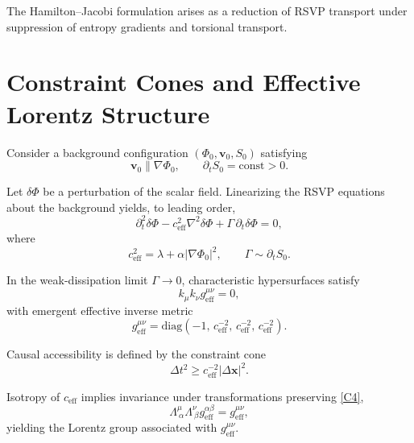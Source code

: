 \documentclass[11pt]{article}
\begin{document}
The Hamilton--Jacobi formulation arises as a reduction of RSVP transport under suppression of entropy gradients and torsional transport.

\section{Constraint Cones and Effective Lorentz Structure}

Consider a background configuration $(\Phi_0,\mathbf{v}_0,S_0)$ satisfying
\begin{equation}
\mathbf{v}_0 \parallel \nabla\Phi_0,
\qquad
\partial_t S_0 = \mathrm{const} > 0.
\label{C1}
\end{equation}

Let $\delta\Phi$ be a perturbation of the scalar field. Linearizing the RSVP equations about the background yields, to leading order,
\begin{equation}
\partial_t^2 \delta\Phi
-
c_{\mathrm{eff}}^2 \nabla^2 \delta\Phi
+
\Gamma\,\partial_t \delta\Phi
=0,
\label{C2}
\end{equation}
where
\begin{equation}
c_{\mathrm{eff}}^2 = \lambda + \alpha |\nabla\Phi_0|^2,
\qquad
\Gamma \sim \partial_t S_0.
\label{C3}
\end{equation}

In the weak-dissipation limit $\Gamma \to 0$, characteristic hypersurfaces satisfy
\begin{equation}
k_\mu k_\nu g_{\mathrm{eff}}^{\mu\nu} = 0,
\label{C4}
\end{equation}
with emergent effective inverse metric
\begin{equation}
g_{\mathrm{eff}}^{\mu\nu}
=
\mathrm{diag}
\left(
-1,\,
c_{\mathrm{eff}}^{-2},\,
c_{\mathrm{eff}}^{-2},\,
c_{\mathrm{eff}}^{-2}
\right).
\label{C5}
\end{equation}

Causal accessibility is defined by the constraint cone
\begin{equation}
\Delta t^2 \ge c_{\mathrm{eff}}^{-2} |\Delta \mathbf{x}|^2.
\label{C6}
\end{equation}

Isotropy of $c_{\mathrm{eff}}$ implies invariance under transformations preserving \eqref{C4},
\begin{equation}
\Lambda^\mu_{\ \alpha}\Lambda^\nu_{\ \beta} g_{\mathrm{eff}}^{\alpha\beta}
=
g_{\mathrm{eff}}^{\mu\nu},
\label{C7}
\end{equation}
yielding the Lorentz group associated with $g_{\mathrm{eff}}^{\mu\nu}$.
\end{document}
